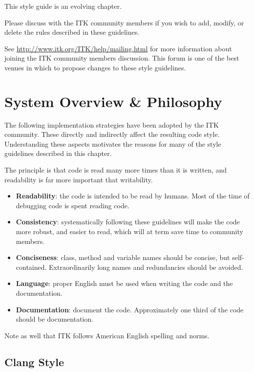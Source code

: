 This style guide is an evolving chapter.

Please discuss with the ITK community members if you wish to add, modify, or
delete the rules described in these guidelines.

See \href{http://www.itk.org/ITK/help/mailing.html}{http://www.itk.org/ITK/help/mailing.html}
for more information about joining the ITK community members discussion. This
forum is one of the best venues in which to propose changes to these style
guidelines.


\section{System Overview \& Philosophy}
\label{sec:SystemOverviewPhilosophy}

The following implementation strategies have been adopted by the ITK community.
These directly and indirectly affect the resulting code style. Understanding
these aspects motivates the reasons for many of the style guidelines described
in this chapter.

The principle is that code is read many more times than it is written, and
readability is far more important that writability.

\begin{itemize}
\item \textbf{Readability}: the code is intended to be read by humans. Most of
the time of debugging code is spent reading code.
\item \textbf{Consistency}: systematically following these guidelines will make
the code more robust, and easier to read, which will at term save time to
community members.
\item \textbf{Conciseness}: class, method and variable names should be concise,
but self-contained. Extraordinarily long names and redundancies should be
avoided.
\item \textbf{Language}: proper English must be used when writing the code and
the documentation.
\item \textbf{Documentation}: document the code. Approximately one third of the
code should be documentation.
\end{itemize}

Note as well that ITK follows American English spelling and norms.


\subsection{Clang Style}
\label{subsec:clangStyle}


